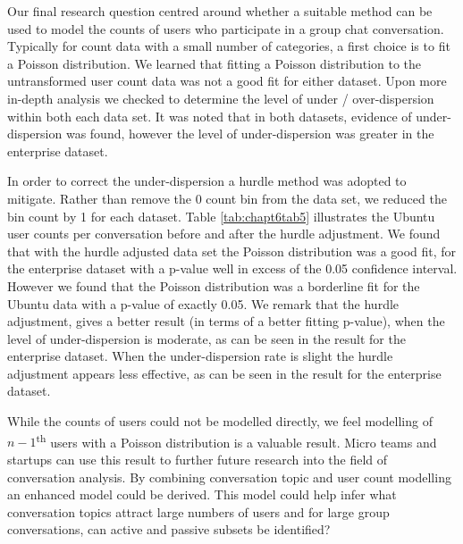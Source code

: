 Our final research question centred around whether a suitable method can be used to model the counts of users who participate in a group chat conversation. Typically for count data with a small number of categories, a first choice is to fit a Poisson distribution. We learned that fitting a Poisson distribution to the untransformed user count data was not a good fit for either dataset. Upon more in-depth analysis we checked to determine the level of under / over-dispersion within both each data set. It was noted that in both datasets, evidence of under-dispersion was found, however the level of under-dispersion was greater in the enterprise dataset. 

In order to correct the under-dispersion a hurdle method was adopted to mitigate. Rather than remove the 0 count bin from the data set, we reduced the bin count by 1 for each dataset. Table \ref{tab:chapt6tab5} illustrates the Ubuntu user counts per conversation before and after the hurdle adjustment. We found that with the hurdle adjusted data set the Poisson distribution was a good fit, for the enterprise dataset with a p-value well in excess of the 0.05 confidence interval. However we found that the Poisson distribution was a borderline fit for the Ubuntu data with a p-value of exactly 0.05. We remark that the hurdle adjustment, gives a better result (in terms of a better fitting p-value), when the level of under-dispersion is moderate, as can be seen in the result for the enterprise dataset. When the under-dispersion rate is slight the hurdle adjustment appears less effective, as can be seen in the result for the enterprise dataset.




While the counts of users could not be modelled directly, we feel modelling of $n-1$\textsuperscript{th} users with a Poisson distribution is a valuable result. Micro teams and startups can use this result to further future research into the field of conversation analysis. By combining conversation topic and user count modelling an enhanced model could be derived. This model could help infer what conversation topics attract large numbers of users and for large group conversations, can active and passive subsets be identified?


